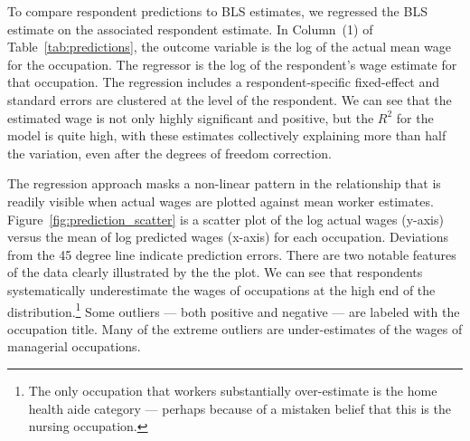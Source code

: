 \documentclass[11pt]{article}
\begin{document}
To compare respondent predictions to BLS estimates, we regressed the BLS estimate on the associated respondent estimate. 
In Column~(1) of Table~\ref{tab:predictions}, the outcome variable is the log of the actual mean wage for the occupation. 
The regressor is the log of the respondent's wage estimate for that occupation. 
The regression includes a respondent-specific fixed-effect and standard errors are clustered at the level of the respondent. 
We can see that the estimated wage is not only highly significant and positive, but the $R^2$ for the model is quite high, with these estimates collectively explaining more than half the variation, even after the degrees of freedom correction. 


The regression approach masks a non-linear pattern in the relationship that is readily visible when actual wages are plotted against mean worker estimates. 
Figure~\ref{fig:prediction_scatter} is a scatter plot of the log actual wages (y-axis) versus the mean of log predicted wages (x-axis) for each occupation. 
Deviations from the 45 degree line indicate prediction errors. 
There are two notable features of the data clearly illustrated by the the plot. 
We can see that respondents systematically underestimate the wages of occupations at the high end of the distribution.\footnote
{
The only occupation that workers substantially over-estimate is the home health aide category --- perhaps because of a mistaken belief that this is the nursing occupation.
}  
Some outliers --- both positive and negative --- are labeled with the occupation title.  
Many of the extreme outliers are under-estimates of the wages of managerial occupations. 
\end{document}
